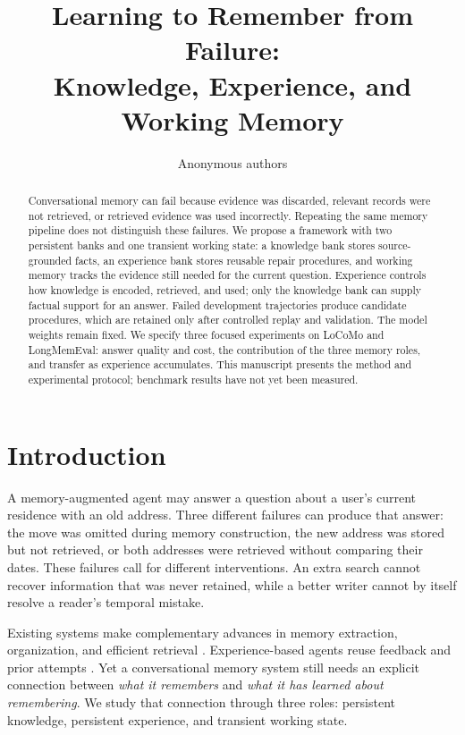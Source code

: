 \documentclass{article}
\title{Learning to Remember from Failure:\\Knowledge, Experience, and Working Memory}
\author{Anonymous authors}
\begin{document}
\maketitle
{}

\begin{abstract}
Conversational memory can fail because evidence was discarded, relevant records
were not retrieved, or retrieved evidence was used incorrectly. Repeating the
same memory pipeline does not distinguish these failures. We propose a framework
with two persistent banks and one transient working state: a knowledge bank
stores source-grounded facts, an experience bank stores reusable repair
procedures, and working memory tracks the evidence still needed for the current
question. Experience controls how knowledge is encoded, retrieved, and used;
only the knowledge bank can supply factual support for an answer. Failed
development trajectories produce candidate procedures, which are retained only
after controlled replay and validation. The model weights remain fixed.
We specify three focused experiments on LoCoMo and LongMemEval: answer quality
and cost, the contribution of the three memory roles, and transfer as experience
accumulates. This manuscript presents the method and experimental protocol;
benchmark results have not yet been measured.
\end{abstract}

\section{Introduction}
A memory-augmented agent may answer a question about a user's current residence
with an old address. Three different failures can produce that answer: the move
was omitted during memory construction, the new address was stored but not
retrieved, or both addresses were retrieved without comparing their dates.
These failures call for different interventions. An extra search cannot recover
information that was never retained, while a better writer cannot by itself
resolve a reader's temporal mistake.

Existing systems make complementary advances in memory extraction, organization,
and efficient retrieval \citep{mem0,amem,simplemem,lightmem}. Experience-based
agents reuse feedback and prior attempts \citep{reflexion,adamem,reme}.
Yet a conversational memory system still needs an explicit connection between
\emph{what it remembers} and \emph{what it has learned about remembering}.
We study that connection through three roles: persistent knowledge, persistent
experience, and transient working state.
\end{document}

